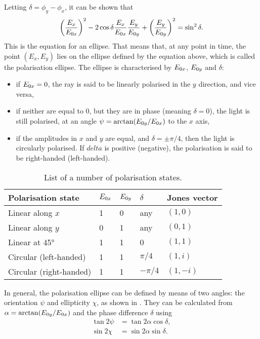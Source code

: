 Letting $ \delta = \phi_y-\phi_x $, it can be shown that 
\begin{equation}
	\left(\frac{E_x}{E_{0x}}\right)^2 - 2\cos\delta\frac{E_x}{E_{0x}}\frac{E_y}{E_{0y}} + \left(\frac{E_y}{E_{0y}}\right)^2 = \sin^2\delta.
\end{equation}
This is the equation for an ellipse. That means that, at any point in time, the point $ (E_x, E_y) $ lies on the ellipse defined by the equation above, which is called the polarisation ellipse. The ellipse is characterised by $ E_{0x} $, $ E_{0y} $ and $ \delta $:
\begin{itemize}
	\item if $ E_{0x} = 0 $, the ray is said to be linearly polarised in the $ y $ direction, and vice versa,
	\item if neither are equal to 0, but they are in phase (meaning $ \delta=0 $), the light is still polarised, at an angle $ \psi = \arctan(E_{0y}/E_{0x}) $ to the $ x $ axis,
	\item if the amplitudes in $ x $ and $ y $ are equal, and $ \delta = \pm \pi/4 $, then the light is circularly polarised. If $ delta $ is positive (negative), the polarisation is said to be right-handed (left-handed). 
\end{itemize}

\begin{table}
	\centering
	\caption{List of a number of polarisation states.}
	\label{tab:polarisation states}
	\begin{tabular}{lllll}
		\toprule
		Polarisation state      & $ E_{0x} $ & $ E_{0y} $ & $ \delta $ & Jones vector \\ \midrule
		Linear along $ x $      & 1            & 0            & any        & $ (1, 0) $   \\
		Linear along $ y $      & 0            & 1            & any        & $ (0, 1) $   \\
		Linear at \ang{45}      & 1            & 1            & 0          & $ (1, 1) $   \\
		Circular (left-handed)  & 1            & 1            & $ \pi/4 $  & $ (1, i) $   \\
		Circular (right-handed) & 1            & 1            & $ -\pi/4 $ & $ (1, -i) $  \\ \bottomrule
	\end{tabular}
\end{table}


In general, the polarisation ellipse can be defined by means of two angles: the orientation $ \psi $ and ellipticity $ \chi $, as shown in . They can be calculated from $ \alpha = \arctan(E_{0y}/E_{0x}) $ and the phase difference $ \delta $ using
\begin{align}
	\tan 2\psi &= \tan 2\alpha \cos \delta,\\
	\sin 2\chi &= \sin 2\alpha \sin \delta.
\end{align}

